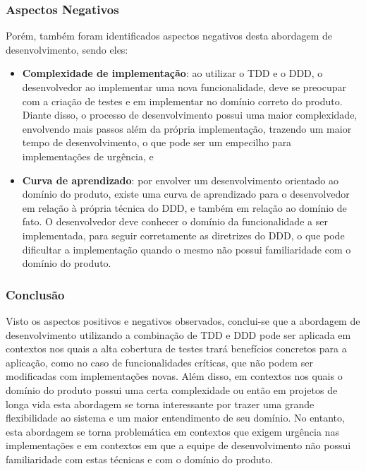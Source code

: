 \subsubsection{Aspectos Negativos}

Porém, também foram identificados aspectos negativos desta abordagem de desenvolvimento, sendo eles:

\begin{itemize}
  \item\textbf{Complexidade de implementação}: ao utilizar o TDD e o DDD, o desenvolvedor ao implementar 
  uma nova funcionalidade, deve se preocupar com a criação de testes e em implementar no domínio correto 
  do produto. Diante disso, o processo de desenvolvimento possui uma maior complexidade, envolvendo mais 
  passos além da própria implementação, trazendo um maior tempo de desenvolvimento, o que pode ser um 
  empecilho para implementações de urgência, e
  
  \item\textbf{Curva de aprendizado}: por envolver um desenvolvimento orientado ao domínio do produto, 
  existe uma curva de aprendizado para o desenvolvedor em relação à própria técnica do DDD, e também em 
  relação ao domínio de fato. O desenvolvedor deve conhecer o domínio da funcionalidade a ser implementada, 
  para seguir corretamente as diretrizes do DDD, o que pode dificultar a implementação quando o mesmo não possui 
  familiaridade com o domínio do produto.
\end{itemize}

\subsubsection{Conclusão}

Visto os aspectos positivos e negativos observados, conclui-se que a abordagem de 
desenvolvimento utilizando a combinação de TDD e DDD pode ser aplicada em contextos nos 
quais a alta cobertura de testes trará benefícios concretos para a aplicação, como no 
caso de funcionalidades críticas, que não podem ser modificadas com implementações novas. 
Além disso, em contextos nos quais o domínio do produto possui uma certa complexidade ou 
então em projetos de longa vida esta abordagem se torna interessante por trazer uma grande 
flexibilidade ao sistema e um maior entendimento de seu domínio. No entanto, esta abordagem 
se torna problemática em contextos que exigem urgência nas implementações e em contextos 
em que a equipe de desenvolvimento não possui familiaridade com estas técnicas e com o domínio do produto.

